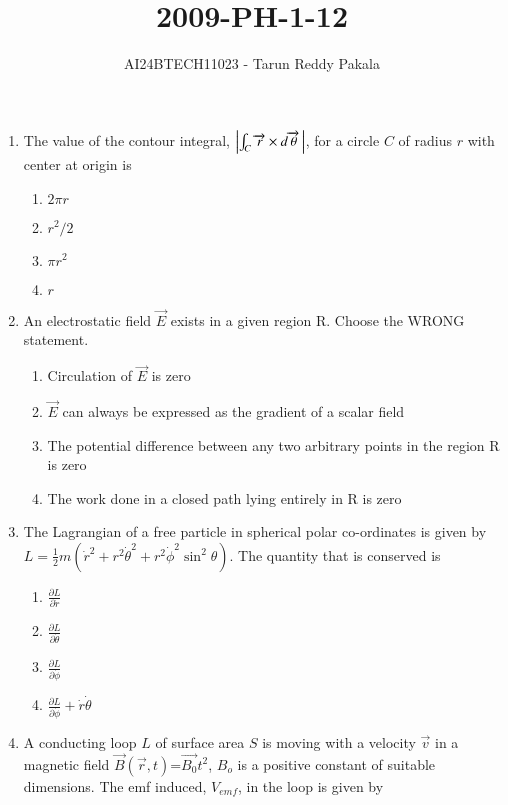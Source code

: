 \documentclass[journal,12pt,onecolumn]{IEEEtran}
\title{2009-PH-1-12}
\author{AI24BTECH11023 - Tarun Reddy Pakala}
\theoremstyle{remark}
\begin{document}


\maketitle
\bigskip
\renewcommand{\thefigure}{\theenumi}
\renewcommand{\thetable}{\theenumi}
\begin{enumerate}
    \item The value of the contour integral, $\left\vert\int_{C} \overrightarrow{r} \times d\overrightarrow{\theta} \, \right\vert$, for a circle $C$ of radius $r$ with center at origin is
    \begin{enumerate}
    \item $2\pi r$
    \item $r^2/2$
    \item $\pi r^2$
    \item $r$
    \end{enumerate}
    \item An electrostatic field $\overrightarrow{E}$ exists in a given region R. Choose the WRONG statement.
    \begin{enumerate}
    \item Circulation of $\overrightarrow{E}$ is zero
    \item $\overrightarrow{E}$ can always be expressed as the gradient of a scalar field
    \item The potential difference between any two arbitrary points in the region R is zero
    \item The work  done in a closed path lying entirely in R is zero
    \end{enumerate}
    \item The Lagrangian of a free particle in spherical polar co-ordinates is given by $L = \frac{1}{2} m \left( \dot{r}^2 + r^2 \dot{\theta}^2 + r^2 \dot{\phi}^2 \sin^2 \theta \right)$. The quantity that is conserved is
    \begin{enumerate}
    \item $\frac{\partial L}{\partial \dot{r}}$
    \item $\frac{\partial L}{\partial \dot{\theta}}$
    \item $\frac{\partial L}{\partial \dot{\phi}}$
    \item $\frac{\partial L}{\partial \dot{\phi}} + \dot{r} \dot{\theta}$
    \end{enumerate}
    \item A conducting loop $L$ of surface area $S$ is moving with a velocity $\overrightarrow{v}$ in a magnetic field $\overrightarrow{B}(\overrightarrow{r},t)$=$\overrightarrow{B_0}t^2$, $B_o$ is a positive constant of suitable dimensions. The emf induced, $V_{emf}$, in the loop is given by

\end{enumerate}
\end{document}
